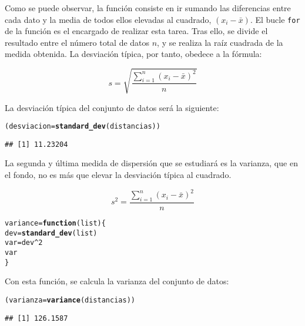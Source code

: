 \documentclass[12pt]{report}\usepackage[]{graphicx}\usepackage[dvipsnames]{xcolor}
\makeatletter
\newcommand{\hlnum}[1]{\textcolor[rgb]{0.686,0.059,0.569}{#1}}%
\newcommand{\hlopt}[1]{\textcolor[rgb]{0,0,0}{#1}}%
\newcommand{\hlstd}[1]{\textcolor[rgb]{0.345,0.345,0.345}{#1}}%
\newcommand{\hlkwa}[1]{\textcolor[rgb]{0.161,0.373,0.58}{\textbf{#1}}}%
\newcommand{\hlkwb}[1]{\textcolor[rgb]{0.69,0.353,0.396}{#1}}%
\newcommand{\hlkwc}[1]{\textcolor[rgb]{0.333,0.667,0.333}{#1}}%
\newcommand{\hlkwd}[1]{\textcolor[rgb]{0.737,0.353,0.396}{\textbf{#1}}}%
\newenvironment{kframe}{%
 \def\at@end@of@kframe{}%
 \ifinner\ifhmode%
  \def\at@end@of@kframe{\end{minipage}}%
  \begin{minipage}{\columnwidth}%
 \fi\fi%
 \def\FrameCommand##1{\hskip\@totalleftmargin \hskip-\fboxsep
 \colorbox{shadecolor}{##1}\hskip-\fboxsep
     \hskip-\linewidth \hskip-\@totalleftmargin \hskip\columnwidth}%
 \MakeFramed {\advance\hsize-\width
   \@totalleftmargin\z@ \linewidth\hsize
   \@setminipage}}%
 {\par\unskip\endMakeFramed%
 \at@end@of@kframe}
\newenvironment{knitrout}{}{} %
\makeatother
\begin{document}
			Como se puede observar, la función consiste en ir sumando las diferencias entre cada dato y la media de todos ellos elevadas al cuadrado, $(x_i - \bar{x})$. El bucle \texttt{for} de la función es el encargado de realizar esta tarea. Tras ello, se divide el resultado entre el número total de datos $n$, y se realiza la raíz cuadrada de la medida obtenida. La desviación típica, por tanto, obedece a la fórmula: 
			
			$$
			s = \sqrt{\frac{\displaystyle\sum_{i=1}^n (x_i-\bar{x})^2}{n}}
			$$
			
			La desviación típica del conjunto de datos será la siguiente:
			
\begin{knitrout}
\color{fgcolor}\begin{kframe}
\begin{alltt}
\hlstd{(desviacion} \hlkwb{=} \hlkwd{standard_dev}\hlstd{(distancias))}
\end{alltt}
\begin{verbatim}
## [1] 11.23204
\end{verbatim}
\end{kframe}
\end{knitrout}
			
			La segunda y última medida de dispersión que se estudiará es la varianza, que en el fondo, no es más que elevar la desviación típica al cuadrado.
			
			$$
			s^2 = \frac{\displaystyle\sum_{i=1}^n (x_i-\bar{x})^2}{n}
			$$
			
\begin{knitrout}
\color{fgcolor}\begin{kframe}
\begin{alltt}
\hlstd{variance} \hlkwb{=} \hlkwa{function}\hlstd{(}\hlkwc{list}\hlstd{) \{}
        \hlstd{dev} \hlkwb{=} \hlkwd{standard_dev}\hlstd{(list)}
        \hlstd{var} \hlkwb{=} \hlstd{dev}\hlopt{^}\hlnum{2}
        \hlstd{var}
\hlstd{\}}
\end{alltt}
\end{kframe}
\end{knitrout}
			
			Con esta función, se calcula la varianza del conjunto de datos:
			
\begin{knitrout}
\color{fgcolor}\begin{kframe}
\begin{alltt}
\hlstd{(varianza} \hlkwb{=} \hlkwd{variance}\hlstd{(distancias))}
\end{alltt}
\begin{verbatim}
## [1] 126.1587
\end{verbatim}
\end{kframe}
\end{knitrout}
			
\end{document}
